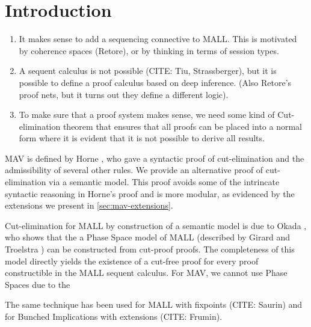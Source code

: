 \section{Introduction}\label{sec:introduction}

\begin{enumerate}
      \item It makes sense to add a sequencing connective to MALL. This is
            motivated by coherence spaces (Retore), or by thinking in terms of
            session types.
      \item A sequent calculus is not possible (CITE: Tiu, Strassberger),
            but it is possible to define a proof calculus based on deep
            inference. (Also Retore's proof nets, but it turns out they define a
            different logic).
      \item To make sure that a proof system makes sense, we need some kind
            of Cut-elimination theorem that ensures that all proofs can be
            placed into a normal form where it is evident that it is not
            possible to derive all results.
\end{enumerate}

MAV is defined by Horne \cite{Horne15:mav}, who gave a syntactic proof
of cut-elimination and the admissibility of several other rules. We
provide an alternative proof of cut-elimination via a semantic
model. This proof avoids some of the intrincate syntactic reasoning in
Horne's proof and is more modular, as evidenced by the extensions we
present in \autoref{sec:mav-extensions}.

Cut-elimination for MALL by construction of a semantic model is due to
Okada \cite{Okada99:psc}, who shows that the a Phase Space model of
MALL (described by Girard \cite{Girard87:ll} and Troelstra
\cite{TroelstraXX:lnll}) can be constructed from cut-proof proofs. The
completeness of this model directly yields the existence of a cut-free
proof for every proof constructible in the MALL sequent calculus. For
MAV, we cannot use Phase Spaces due to the

The same technique has been used for MALL with fixpoints (CITE:
Saurin) and for Bunched Implications with extensions (CITE: Frumin).
